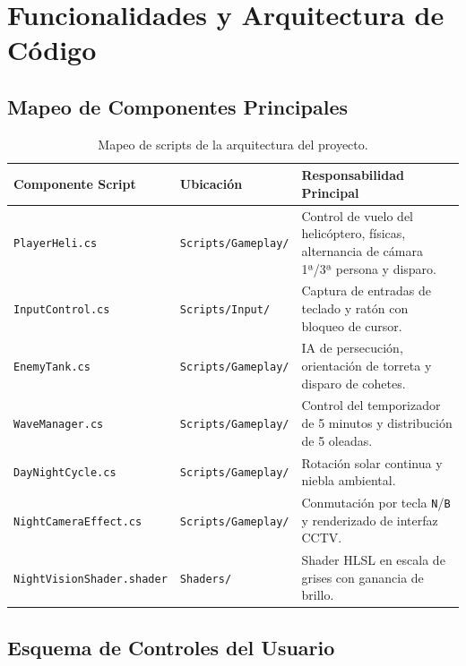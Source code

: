 \documentclass[12pt,a4paper]{article}
\begin{document}
\section{Funcionalidades y Arquitectura de Código}

\subsection{Mapeo de Componentes Principales}

\begin{table}[h!]
\centering
\small
\begin{tabular}{@{}llp{8cm}@{}}
\toprule
\textbf{Componente Script} & \textbf{Ubicación} & \textbf{Responsabilidad Principal} \\ \midrule
\texttt{PlayerHeli.cs} & \texttt{Scripts/Gameplay/} & Control de vuelo del helicóptero, físicas, alternancia de cámara 1ª/3ª persona y disparo. \\
\texttt{InputControl.cs} & \texttt{Scripts/Input/} & Captura de entradas de teclado y ratón con bloqueo de cursor. \\
\texttt{EnemyTank.cs} & \texttt{Scripts/Gameplay/} & IA de persecución, orientación de torreta y disparo de cohetes. \\
\texttt{WaveManager.cs} & \texttt{Scripts/Gameplay/} & Control del temporizador de 5 minutos y distribución de 5 oleadas. \\
\texttt{DayNightCycle.cs} & \texttt{Scripts/Gameplay/} & Rotación solar continua y niebla ambiental. \\
\texttt{NightCameraEffect.cs} & \texttt{Scripts/Gameplay/} & Conmutación por tecla \texttt{N}/\texttt{B} y renderizado de interfaz CCTV. \\
\texttt{NightVisionShader.shader} & \texttt{Shaders/} & Shader HLSL en escala de grises con ganancia de brillo. \\ \bottomrule
\end{tabular}
\caption{Mapeo de scripts de la arquitectura del proyecto.}
\end{table}

\subsection{Esquema de Controles del Usuario}
\end{document}
